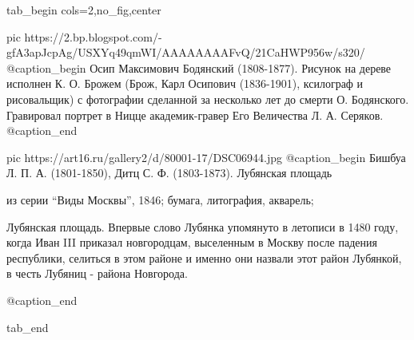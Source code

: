  
 
 
 
 


\ifcmt
  tab_begin cols=2,no_fig,center

     pic https://2.bp.blogspot.com/-gfA3apJcpAg/USXYq49qmWI/AAAAAAAAFvQ/21CaHWP956w/s320/%
     @caption_begin
Осип Максимович Бодянский (1808-1877). Рисунок на дереве исполнен К. О. Брожем
(Брож, Карл Осипович (1836-1901), ксилограф и рисовальщик) с фотографии
сделанной за несколько лет до смерти О.  Бодянского. Гравировал портрет в Ницце
академик-гравер Его Величества Л. А. Серяков.
     @caption_end

     pic https://art16.ru/gallery2/d/80001-17/DSC06944.jpg
     @caption_begin
Бишбуа Л. П. А. (1801-1850), Дитц С. Ф. (1803-1873). Лубянская площадь

из серии \enquote{Виды Москвы}, 1846; бумага, литография, акварель;

Лубянская площадь. Впервые слово Лубянка упомянуто в летописи в 1480 году,
когда Иван III приказал новгородцам, выселенным в Москву после падения
республики, селиться в этом районе и именно они назвали этот район Лубянкой, в
честь Лубяниц - района Новгорода.

     @caption_end

  tab_end
\fi
